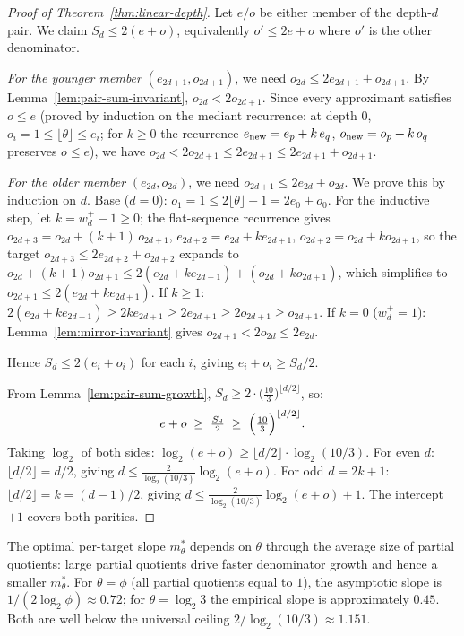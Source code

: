 \documentclass[12pt]{article}
\theoremstyle{definition}
\theoremstyle{remark}
\theoremstyle{plain}
\begin{document}
\begin{proof}[Proof of Theorem~\ref{thm:linear-depth}]
Let $e/o$ be either member of the depth-$d$ pair.
We claim $S_d \leq 2(e+o)$, equivalently $o' \leq 2e+o$ where $o'$ is the other denominator.

\textit{For the younger member} $(e_{2d+1}, o_{2d+1})$, we need $o_{2d} \leq 2e_{2d+1}+o_{2d+1}$.
By Lemma~\ref{lem:pair-sum-invariant}, $o_{2d} < 2o_{2d+1}$.
Since every approximant satisfies $o \leq e$ (proved by induction on the mediant recurrence:
at depth $0$, $o_i = 1 \leq \lfloor\theta\rfloor \leq e_i$; for $k \geq 0$ the recurrence
$e_{\rm new} = e_p + k\,e_q$, $o_{\rm new} = o_p + k\,o_q$ preserves $o \leq e$),
we have $o_{2d} < 2o_{2d+1} \leq 2e_{2d+1} \leq 2e_{2d+1}+o_{2d+1}$.

\textit{For the older member} $(e_{2d}, o_{2d})$, we need $o_{2d+1} \leq 2e_{2d}+o_{2d}$.
We prove this by induction on $d$.
Base ($d=0$): $o_1 = 1 \leq 2\lfloor\theta\rfloor + 1 = 2e_0+o_0$.
For the inductive step, let $k = w^+_d - 1 \geq 0$; the flat-sequence recurrence gives
$o_{2d+3} = o_{2d} + (k+1)\,o_{2d+1}$, $e_{2d+2} = e_{2d}+ke_{2d+1}$, $o_{2d+2} = o_{2d}+ko_{2d+1}$,
so the target $o_{2d+3} \leq 2e_{2d+2}+o_{2d+2}$ expands to
$o_{2d}+(k+1)o_{2d+1} \leq 2(e_{2d}+ke_{2d+1})+(o_{2d}+ko_{2d+1})$,
which simplifies to $o_{2d+1} \leq 2(e_{2d}+ke_{2d+1})$.
If $k \geq 1$: $2(e_{2d}+ke_{2d+1}) \geq 2ke_{2d+1} \geq 2e_{2d+1} \geq 2o_{2d+1} \geq o_{2d+1}$.
If $k = 0$ ($w^+_d = 1$): Lemma~\ref{lem:mirror-invariant} gives $o_{2d+1} < 2o_{2d} \leq 2e_{2d}$.

Hence $S_d \leq 2(e_i+o_i)$ for each $i$, giving $e_i+o_i \geq S_d/2$.

From Lemma~\ref{lem:pair-sum-growth},
$S_d \geq 2\cdot\bigl(\tfrac{10}{3}\bigr)^{\lfloor d/2\rfloor}$, so:
\[
  e + o \;\geq\; \tfrac{S_d}{2} \;\geq\; \Bigl(\tfrac{10}{3}\Bigr)^{\lfloor d/2\rfloor}.
\]
Taking $\log_2$ of both sides:
$\log_2(e+o) \geq \lfloor d/2\rfloor\cdot\log_2(10/3)$.
For even $d$: $\lfloor d/2\rfloor = d/2$, giving
$d \leq \tfrac{2}{\log_2(10/3)}\log_2(e+o)$.
For odd $d = 2k+1$: $\lfloor d/2\rfloor = k = (d-1)/2$, giving
$d \leq \tfrac{2}{\log_2(10/3)}\log_2(e+o) + 1$.
The intercept $+1$ covers both parities.
\end{proof}

The optimal per-target slope $m^*_\theta$ depends on $\theta$ through the average
size of partial quotients: large partial quotients drive faster denominator
growth and hence a smaller $m^*_\theta$.  For $\theta = \phi$ (all partial
quotients equal to $1$), the asymptotic slope is $1/(2\log_2\phi) \approx 0.72$;
for $\theta = \log_2 3$ the empirical slope is approximately $0.45$.
Both are well below the universal ceiling $2/\log_2(10/3) \approx 1.151$.
\end{document}
